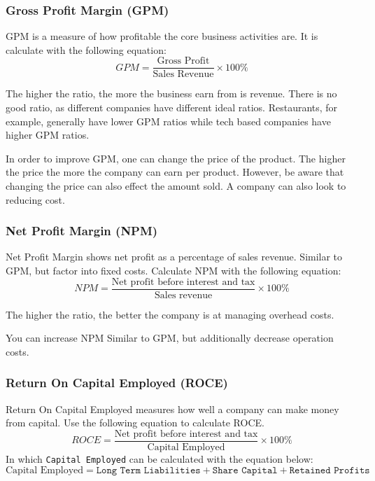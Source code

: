 \documentclass{standalone}
\begin{document}
\subsubsection{Gross Profit Margin (GPM)}
GPM is a measure of how profitable the core business activities are.
It is calculate with the following equation:
\begin{equation}
    GPM = \frac{\textrm{Gross Profit}}{\textrm{Sales Revenue}} \times 100\%
\end{equation}

The higher the ratio, the more the business earn from is revenue.
There is no good ratio, as different companies have different ideal ratios.
Restaurants, for example, generally have lower GPM ratios while tech based companies have higher GPM ratios.

In order to improve GPM, one can change the price of the product.
The higher the price the more the company can earn per product.
However, be aware that changing the price can also effect the amount sold.
A company can also look to reducing cost.

\subsubsection{Net Profit Margin (NPM)}
Net Profit Margin shows net profit as a percentage of sales revenue.
Similar to GPM, but factor into fixed costs.
Calculate NPM with the following equation:
\begin{equation}
    NPM = \frac{\textrm{Net profit before interest and tax}}{\textrm{Sales revenue}} \times 100\%
\end{equation}

The higher the ratio, the better the company is at managing overhead costs.

You can increase NPM Similar to GPM, but additionally decrease operation costs.

\subsubsection{Return On Capital Employed (ROCE)}
Return On Capital Employed measures how well a company can make money from capital.
Use the following equation to calculate ROCE.
\begin{equation}
    ROCE = \frac{\textrm{Net profit before interest and tax}}{\textrm{Capital Employed}} \times 100\%
\end{equation}
In which \texttt{Capital Employed} can be calculated with the equation below:
\begin{equation}
    \textrm{Capital Employed} = \texttt{Long Term Liabilities} + \texttt{Share Capital} + \texttt{Retained Profits}
\end{equation}
\end{document}
